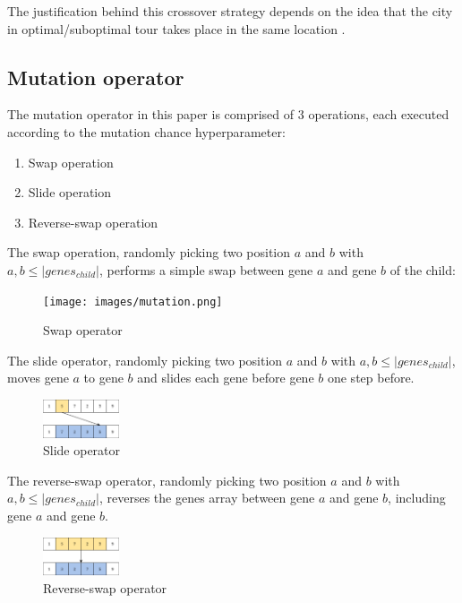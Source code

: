 \documentclass[conference]{IEEEtran}
\begin{document}
The justification behind this crossover strategy depends on the idea that the city in optimal/suboptimal tour takes place
in the same location \cite{b6}.

\subsection{Mutation operator}
The mutation operator in this paper is comprised of 3 operations, each executed according to the mutation chance hyperparameter:

\begin{enumerate}
    \item Swap operation
    \item Slide operation
    \item Reverse-swap operation
\end{enumerate}

The swap operation, randomly picking two position $a$ and $b$ with $a, b \leq |genes_{child}|$, performs a simple swap between
gene $a$ and gene $b$ of the child:

\begin{figure}[h]
    \centering
    \texttt{[image: images/mutation.png]}
    \caption{Swap operator}
\end{figure}

The slide operator, randomly picking two position $a$ and $b$ with $a, b \leq |genes_{child}|$, moves gene $a$ to gene
$b$ and slides each gene before gene $b$ one step before.

\begin{figure}[h]
    \centering
    \includegraphics[width=0.20\textwidth]{images/mutation 2.png}
    \caption{Slide operator}
\end{figure}

The reverse-swap operator, randomly picking two position $a$ and $b$ with $a, b \leq |genes_{child}|$, reverses the genes
array between gene $a$ and gene $b$, including gene $a$ and gene $b$.

\begin{figure}[h]
    \centering
    \includegraphics[width=0.20\textwidth]{images/mutation 3.png}
    \caption{Reverse-swap operator}
\end{figure}
\end{document}
